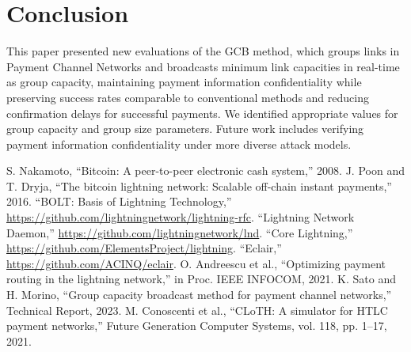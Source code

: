 \documentclass[conference]{IEEEtran}
\begin{document}
\section{Conclusion}

This paper presented new evaluations of the GCB method, which groups links in Payment Channel Networks and broadcasts minimum link capacities in real-time as group capacity, maintaining payment information confidentiality while preserving success rates comparable to conventional methods and reducing confirmation delays for successful payments. We identified appropriate values for group capacity and group size parameters. Future work includes verifying payment information confidentiality under more diverse attack models.

\begin{thebibliography}{00}
	 S. Nakamoto, ``Bitcoin: A peer-to-peer electronic cash system,'' 2008.
	 J. Poon and T. Dryja, ``The bitcoin lightning network: Scalable off-chain instant payments,'' 2016.
	 ``BOLT: Basis of Lightning Technology,'' \url{https://github.com/lightningnetwork/lightning-rfc}.
	 ``Lightning Network Daemon,'' \url{https://github.com/lightningnetwork/lnd}.
	 ``Core Lightning,'' \url{https://github.com/ElementsProject/lightning}.
	 ``Eclair,'' \url{https://github.com/ACINQ/eclair}.
	 O. Andreescu et al., ``Optimizing payment routing in the lightning network,'' in Proc. IEEE INFOCOM, 2021.
	 K. Sato and H. Morino, ``Group capacity broadcast method for payment channel networks,'' Technical Report, 2023.
	 M. Conoscenti et al., ``CLoTH: A simulator for HTLC payment networks,'' Future Generation Computer Systems, vol. 118, pp. 1--17, 2021.
\end{thebibliography}
\end{document}

